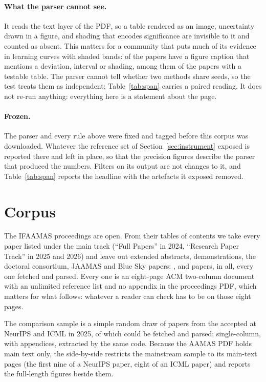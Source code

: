 \documentclass[sigconf,anonymous]{aamas}
\begin{document}
\paragraph{What the parser cannot see.} It reads the text layer of the PDF,
so a table rendered as an image, uncertainty drawn in a figure, and shading
that encodes significance are invisible to it and counted as absent. This
matters for a community that puts much of its evidence in learning curves
with shaded bands: \nFigCaptionUncPapersPct{} of the papers have a figure
caption that mentions a deviation, interval or shading, among them
\nFigCaptionUncTestablePapers{} of the \nAPapersTestable{} papers with a
testable table. The parser cannot tell whether two methods share seeds, so
the test treats them as independent; Table~\ref{tab:span} carries a paired
reading. It does not re-run anything: everything here is a statement about
the page.

\paragraph{Frozen.} The parser and every rule above were fixed and tagged
before this corpus was downloaded. Whatever the reference set of
Section~\ref{sec:instrument} exposed is reported there and left in place, so
that the precision figures describe the parser that produced the numbers.
Filters on its output are not changes to it, and Table~\ref{tab:span}
reports the headline with the artefacts it exposed removed.

\section{Corpus}
\label{sec:corpus}

The IFAAMAS proceedings are open. From their tables of contents we take every
paper listed under the main track (``Full Papers'' in 2024, ``Research Paper
Track'' in 2025 and 2026) and leave out extended abstracts, demonstrations,
the doctoral consortium, JAAMAS and Blue Sky papers: \nAPapersTwentyFour{},
\nAPapersTwentyFive{} and \nAPapersTwentySix{} papers, \nAPapers{} in all,
every one fetched and parsed. Every one is an eight-page ACM two-column
document with an unlimited reference list and no appendix in the proceedings
PDF, which matters for what follows: whatever a reader can check has to be on
those eight pages.

The comparison sample is a simple random draw of \nMlDrawn{} papers from the
\nMlListed{} accepted at NeurIPS and ICML in 2025, of which \nMlPapers{}
could be fetched and parsed; single-column, with appendices, extracted by the
same code. Because the AAMAS PDF holds main text only, the side-by-side
restricts the mainstream sample to its main-text pages (the first nine of a
NeurIPS paper, eight of an ICML paper) and reports the full-length figures
beside them.
\end{document}
